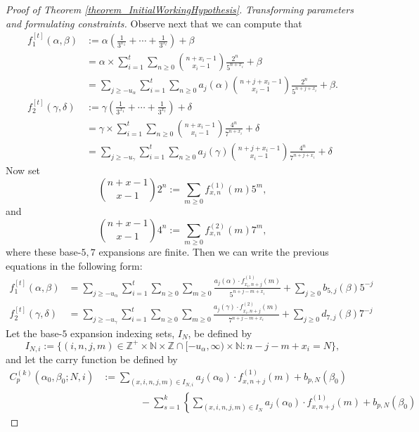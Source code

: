 \documentclass[12pt]{article}
\begin{document}
\begin{proof}[Proof of Theorem \ref{theorem_InitialWorkingHypothesis}]
\bigskip\noindent
\textit{Transforming parameters and formulating constraints.} 
Observe next that we can compute that 
\begin{align*} 
f_1^{[t]}(\alpha,\beta) & := \alpha\left(\frac{1}{3^{x_1}}+\cdots+\frac{1}{3^{x_t}}\right) + \beta \\ 
     & = \alpha \times \sum_{i=1}^t \sum_{n \geq 0} \binom{n+x_i-1}{x_i-1} \frac{2^n}{5^{n+x_i}} + \beta \\ 
     & = 
      \sum_{j \geq -u_{\alpha}} \sum_{i=1}^t \sum_{n \geq 0} a_j(\alpha) 
      \binom{n+j+x_i-1}{x_i-1} \frac{2^n}{5^{n+j+x_i}} + \beta. \\ 
f_2^{[t]}(\gamma,\delta) & := \gamma\left(\frac{1}{3^{x_1}}+\cdots+\frac{1}{3^{x_t}}\right) + \delta \\ 
     & = \gamma \times \sum_{i=1}^t \sum_{n \geq 0} \binom{n+x_i-1}{x_i-1} \frac{4^n}{7^{n+x_i}} + \delta \\ 
     & = 
      \sum_{j \geq -u_{\gamma}} \sum_{i=1}^t \sum_{n \geq 0} a_j(\gamma) 
      \binom{n+j+x_i-1}{x_i-1} \frac{4^n}{7^{n+j+x_i}} + \delta
\end{align*} 
Now set $$\binom{n+x-1}{x-1} 2^n := \sum_{m \geq 0} f_{x,n}^{(1)}(m) 5^m,$$ and 
$$\binom{n+x-1}{x-1} 4^n := \sum_{m \geq 0} f_{x,n}^{(2)}(m) 7^m,$$
where these base-$5,7$ expansions 
are finite. Then we can write the previous equations in the following form: 
\begin{align*} 
f_1^{[t]}(\alpha,\beta) & = 
      \sum_{j \geq -u_{\alpha}} \sum_{i=1}^t \sum_{n \geq 0} \sum_{m \geq 0} 
      \frac{a_j(\alpha) \cdot f_{x_i,n+j}^{(1)}(m)}{5^{n+j-m+x_i}} + 
      \sum_{j \geq 0} b_{5,j}(\beta) 5^{-j} \\ 
f_2^{[t]}(\gamma,\delta) & = 
      \sum_{j \geq -u_{\gamma}} \sum_{i=1}^t \sum_{n \geq 0} \sum_{m \geq 0} 
      \frac{a_j(\gamma) \cdot f_{x_i,n+j}^{(2)}(m)}{7^{n+j-m+x_i}} + 
      \sum_{j \geq 0} d_{7,j}(\beta) 7^{-j} 
\end{align*} 
Let the base-$5$ expansion indexing sets, $I_N$, be defined by 
\[
I_{N,i} := \{(i,n,j,m) \in \mathbb{Z}^+ \times \mathbb{N} \times 
     \mathbb{Z} \cap [-u_{\alpha}, \infty) \times 
     \mathbb{N}: n-j-m+x_i = N\}, 
\] 
and let the carry function be defined by 
\begin{align*} 
C_p^{(k)}(\alpha_0,\beta_0; N, i) & := \sum_{(x,i,n,j,m) \in I_{N,i}} a_j(\alpha_0) \cdot 
     f_{x,n+j}^{(1)}(m)+b_{p,N}(\beta_0) \\ 
     & \phantom{:=\qquad\ } - 
     \sum_{s=1}^k \left\{\sum_{(x,i,n,j,m) \in I_N} a_j(\alpha_0) \cdot f_{x,n+j}^{(1)}(m)+b_{p,N}(\beta_0) 

\end{align*}
\end{proof}
\end{document}
